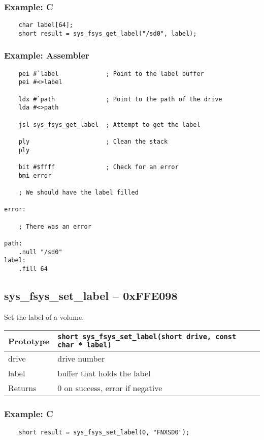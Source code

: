 \subsubsection*{Example: C}
\begin{lstlisting}
    char label[64];
    short result = sys_fsys_get_label("/sd0", label);
\end{lstlisting}

\subsubsection*{Example: Assembler}
\begin{verbatim}
    pei #`label             ; Point to the label buffer
    pei #<>label

    ldx #`path              ; Point to the path of the drive
    lda #<>path

    jsl sys_fsys_get_label  ; Attempt to get the label

    ply                     ; Clean the stack
    ply

    bit #$ffff              ; Check for an error
    bmi error

    ; We should have the label filled

error:

    ; There was an error

path:
    .null "/sd0"
label:
    .fill 64
\end{verbatim}


\subsection*{sys\_fsys\_set\_label -- 0xFFE098}
Set the label of a volume.

\bigskip

\begin{tabular}{|l||l|} \hline
Prototype & \lstinline!short sys_fsys_set_label(short drive, const char * label)! \\ \hline
drive & drive number \\ \hline
label & buffer that holds the label \\ \hline
Returns & 0 on success, error if negative \\ \hline
\end{tabular}

\subsubsection*{Example: C}
\begin{lstlisting}
    short result = sys_fsys_set_label(0, "FNXSD0");
\end{lstlisting}

